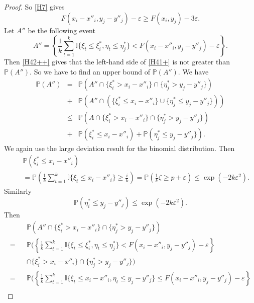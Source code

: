 \documentclass[10pt,a4paper]{amsart}
\def\I{{\mathbb {I}}}                       \def\M{{\mathbb {M}}}
\def\P{{\mathbb {P}}}                       \def\Q{{\mathbb {Q}}}
\begin{document}
\begin{proof}
So \eqref{H7} gives
\begin{equation} \label{H42++}
F(x_i- x''_i, y_j-y''_j) -\varepsilon \ge F(x_i, y_j) - 3 \varepsilon .
\end{equation} 
Let $A''$ be the following event
\begin{equation} \label{H42+++}
A''=  \left\{\frac{1}{k} \sum_{t=1}^k \I\{ \xi_t \le \xi_i^\ast, \eta_t \le \eta_j^\ast \} 
< F(x_i- x''_i, y_j-y''_j) -\varepsilon  \right\} .
\end{equation} 
Then \eqref{H42++} gives that the left-hand side of \eqref{H41+} is not greater than $\P(A'')$.
So we have to find an upper bound of $\P(A'')$.
We have
\begin{eqnarray} \label{H43+}
\P(A'') &=& \P\left(A'' \cap \{ \xi^\ast_i >  x_i- x''_i  \} \cap 
\{ \eta^\ast_j >  y_j- y''_j  \} \right) \\
&+&\P\left(A'' \cap \left(\{ \xi^\ast_i \le  x_i- x''_i  \} 
\cup \{ \eta^\ast_j \le  y_j- y''_j  \} \right) \right) \nonumber \\
&\le&
\P\left(A \cap \{ \xi^\ast_i >  x_i- x''_i  \} \cap \{ \eta^\ast_j >  y_j- y''_j  \} \right) \nonumber \\
&+&\P\left(\xi^\ast_i \le  x_i- x''_i  \right) +
\P\left( \eta^\ast_j \le  y_j- y''_j  \} \right) . \nonumber 
\end{eqnarray}
%
We again use the large deviation result for the binomial distribution.
Then
\begin{eqnarray*}
&&\P\left(\xi^\ast_i \le  x_i- x''_i  \right) \\
&&=\P \left( \frac{1}{k} \sum_{t=1}^k \I\{ \xi_t \le x_i- x''_i\}  \ge \frac{i}{k} \right)
= \P\left(\frac{1}{k} \zeta \ge p+\varepsilon \right)
\le \exp (-2k \varepsilon^2 ) .
\end{eqnarray*}
Similarly 
$$
\P\left(\eta^\ast_i \le  y_j- y''_j  \right) 
\le \exp (-2k \varepsilon^2 ) .
$$
Then
\begin{eqnarray*} 
&& \P\left(A'' \cap \{ \xi^\ast_i >  x_i- x''_i \} \cap \{ \eta^\ast_j >  y_j- y''_j \} \right)  \\
 = &&
\P \Bigg( \left\{ \frac{1}{k} \sum\nolimits_{t=1}^k \I\{ \xi_t \le \xi_i^\ast, \eta_t \le \eta_j^\ast \} 
< F(x_i- x''_i, y_j-y''_j) -\varepsilon  \right\}     \\
&& \cap \{ \xi^\ast_i >  x_i- x''_i  \} \cap \{ \eta^\ast_j >  y_j- y''_j  \} \Bigg)  \\
=&&
\P \Bigg( \left\{ \frac{1}{k} \sum\nolimits_{t=1}^k 
\I\{ \xi_t \le x_i- x''_i, \eta_t \le y_j- y''_j \} 
\le  F(x_i- x''_i, y_j-y''_j) -\varepsilon  \right\}     \\

\end{eqnarray*}
\end{proof}
\end{document}
